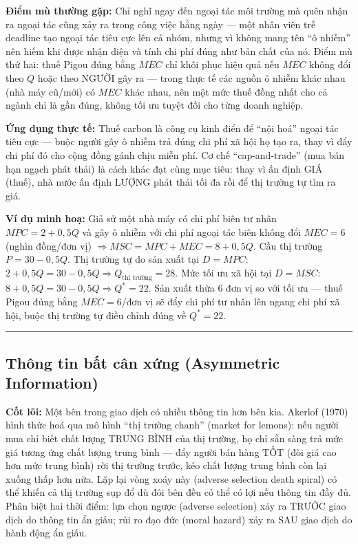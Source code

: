 \documentclass[
]{article}
\begin{document}
\textbf{Điểm mù thường gặp:} Chỉ nghĩ ngay đến ngoại tác môi trường mà
quên nhận ra ngoại tác cũng xảy ra trong công việc hằng ngày --- một
nhân viên trễ deadline tạo ngoại tác tiêu cực lên cả nhóm, nhưng vì
không mang tên ``ô nhiễm'' nên hiếm khi được nhận diện và tính chi phí
đúng như bản chất của nó. Điểm mù thứ hai: thuế Pigou đúng bằng \(MEC\)
chỉ khôi phục hiệu quả nếu \(MEC\) không đổi theo \(Q\) hoặc theo NGƯỜI
gây ra --- trong thực tế các nguồn ô nhiễm khác nhau (nhà máy cũ/mới) có
\(MEC\) khác nhau, nên một mức thuế đồng nhất cho cả ngành chỉ là gần
đúng, không tối ưu tuyệt đối cho từng doanh nghiệp.

\textbf{Ứng dụng thực tế:} Thuế carbon là công cụ kinh điển để ``nội
hoá'' ngoại tác tiêu cực --- buộc người gây ô nhiễm trả đúng chi phí xã
hội họ tạo ra, thay vì đẩy chi phí đó cho cộng đồng gánh chịu miễn phí.
Cơ chế ``cap-and-trade'' (mua bán hạn ngạch phát thải) là cách khác đạt
cùng mục tiêu: thay vì ấn định GIÁ (thuế), nhà nước ấn định LƯỢNG phát
thải tối đa rồi để thị trường tự tìm ra giá.

\textbf{Ví dụ minh hoạ:} Giả sử một nhà máy có chi phí biên tư nhân
\(MPC = 2 + 0{,}5Q\) và gây ô nhiễm với chi phí ngoại tác biên không đổi
\(MEC = 6\) (nghìn đồng/đơn vị)
\(\Rightarrow MSC = MPC + MEC = 8 + 0{,}5Q\). Cầu thị trường
\(P = 30 - 0{,}5Q\). Thị trường tự do sản xuất tại \(D = MPC\):
\(2+0{,}5Q = 30-0{,}5Q \Rightarrow Q_{\text{thị trường}} = 28\). Mức tối
ưu xã hội tại \(D = MSC\):
\(8+0{,}5Q = 30-0{,}5Q \Rightarrow Q^* = 22\). Sản xuất thừa 6 đơn vị so
với tối ưu --- thuế Pigou đúng bằng \(MEC = 6\)/đơn vị sẽ đẩy chi phí tư
nhân lên ngang chi phí xã hội, buộc thị trường tự điều chỉnh đúng về
\(Q^* = 22\).

\begin{center}\rule{0.5\linewidth}{0.5pt}\end{center}

\subsection{Thông tin bất cân xứng (Asymmetric
Information)}\label{thuxf4ng-tin-bux1ea5t-cuxe2n-xux1ee9ng-asymmetric-information}

\textbf{Cốt lõi:} Một bên trong giao dịch có nhiều thông tin hơn bên
kia. Akerlof (1970) hình thức hoá qua mô hình ``thị trường chanh''
(market for lemons): nếu người mua chỉ biết chất lượng TRUNG BÌNH của
thị trường, họ chỉ sẵn sàng trả mức giá tương ứng chất lượng trung bình
--- đẩy người bán hàng TỐT (đòi giá cao hơn mức trung bình) rời thị
trường trước, kéo chất lượng trung bình còn lại xuống thấp hơn nữa. Lặp
lại vòng xoáy này (adverse selection death spiral) có thể khiến cả thị
trường sụp đổ dù đôi bên đều có thể có lợi nếu thông tin đầy đủ. Phân
biệt hai thời điểm: lựa chọn ngược (adverse selection) xảy ra TRƯỚC giao
dịch do thông tin ẩn giấu; rủi ro đạo đức (moral hazard) xảy ra SAU giao
dịch do hành động ẩn giấu.
\end{document}
